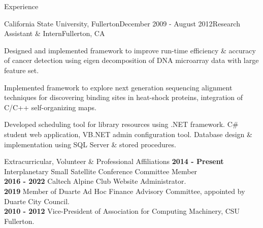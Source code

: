 \documentclass{resume} %
\begin{document}
\begin{rSection}{Experience}

\begin{rSubsection}{California State University, Fullerton}{December 2009 - August 2012}{Research Assistant \& Intern}{Fullerton, CA}
\item Designed and implemented framework to improve run-time efficiency \& accuracy of cancer detection using eigen decomposition of DNA microarray data with large feature set.
\item Implemented framework to explore next generation sequencing alignment techniques for discovering binding sites in heat-shock proteins, integration of C/C++ self-organizing maps.
\item Developed scheduling tool for library resources using .NET framework. C\# student web application, VB.NET admin configuration tool. Database design \& implementation using SQL Server \& stored procedures.
\end{rSubsection}
\end{rSection}


\begin{rSection}{ Extracurricular, Volunteer \& Professional Affiliations}
{\bf 2014 - Present} Interplanetary Small Satellite Conference Committee Member\\
{\bf 2016 - 2022} Caltech Alpine Club Website Administrator. \\
{\bf 2019} Member of Duarte Ad Hoc Finance Advisory Committee, appointed by Duarte City Council. \\
{\bf 2010 - 2012} Vice-President of Association for Computing Machinery, CSU Fullerton. 
\end{rSection}





\end{document}

